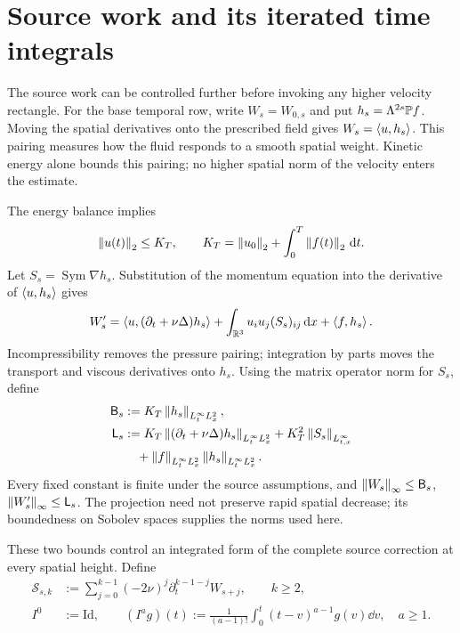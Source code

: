 \section{Source work and its iterated time integrals}
\label{r:sec:source-primitives}

The source work can be controlled further before invoking any higher
velocity rectangle. For the base temporal row, write \(W_s=W_{0,s}\)
and put \(h_s=\Lambda^{2s}\mathbb P f\). Moving the spatial derivatives onto
the prescribed field gives \(W_s=\left\langle u,h_s\right\rangle\). This pairing measures
how the fluid responds to a smooth spatial weight. Kinetic energy alone bounds this pairing; no higher spatial norm
of the velocity enters the estimate.

The energy balance implies
\[
 \left\lVert u(t)\right\rVert_2\le K_T,
 \qquad K_T=\left\lVert u_0\right\rVert_2+\int_0^T\left\lVert f(t)\right\rVert_2\,\mathrm d t.
\]
Let \(S_s=\operatorname{Sym}\nabla h_s\). Substitution of the
momentum equation into the derivative of \(\left\langle u,h_s\right\rangle\) gives
\begin{equation}
 W_s'=\left\langle u,(\partial_t+\nu\Delta)h_s\right\rangle
 +\int_{\mathbb R^3}u_i u_j(S_s)_{ij}\,\mathrm d x+\left\langle f,h_s\right\rangle.
 \label{r:eq:source-first}
\end{equation}
Incompressibility removes the pressure pairing; integration by parts
moves the transport and viscous derivatives onto \(h_s\).
Using the matrix operator norm for \(S_s\), define
\begin{equation}
 \begin{aligned}
 \mathsf B_s&:=K_T\left\lVert h_s\right\rVert_{L^\infty_tL^2_x},\\
 \mathsf L_s&:=K_T\left\lVert (\partial_t+\nu\Delta)h_s\right\rVert_{L^\infty_tL^2_x}
 +K_T^2\left\lVert S_s\right\rVert_{L^\infty_{t,x}}\\
 &\quad+\left\lVert f\right\rVert_{L^\infty_tL^2_x}\left\lVert h_s\right\rVert_{L^\infty_tL^2_x}.
 \end{aligned}
 \label{r:eq:source-work-constants}
\end{equation}
Every fixed constant is finite under the source assumptions, and
\(\left\lVert W_s\right\rVert_\infty\le\mathsf B_s\),
\(\left\lVert W_s'\right\rVert_\infty\le\mathsf L_s\). The projection need not preserve
rapid spatial decrease; its boundedness on Sobolev spaces supplies the
norms used here.

These two bounds control an integrated form of the complete source
correction at every spatial height. Define
\begin{equation}
 \begin{aligned}
 \mathcal S_{s,k}&:=\sum_{j=0}^{k-1}(-2\nu)^j
 \partial_t^{k-1-j}W_{s+j},\qquad k\ge2,\\
 I^0&:=\mathrm{Id},\qquad
 (I^a g)(t):=\frac1{(a-1)!}\int_0^t(t-v)^{a-1}g(v)\dd v,
 \quad a\ge1.
 \end{aligned}
 \label{r:eq:source-primitive-def}
\end{equation}

